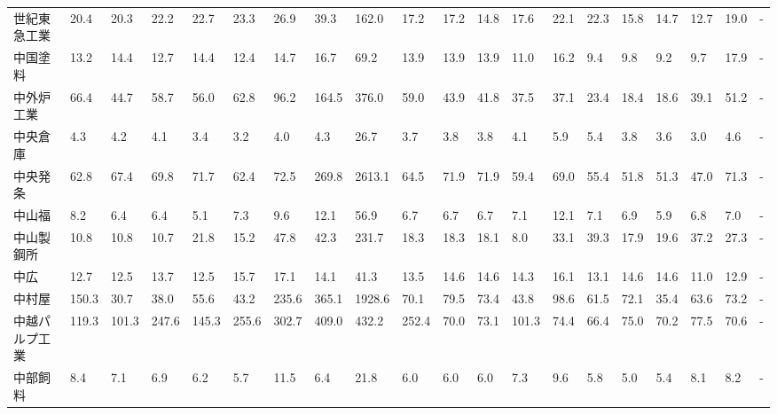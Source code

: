 \begin{tabular}{llllllllllllllllllll}
世紀東急工業          &   20.4 &   20.3 &      22.2 &      22.7 &       23.3 &    26.9 &    39.3 &    162.0 &    17.2 &    17.2 &   14.8 &   17.6 &    22.1 &    22.3 &    15.8 &   14.7 &   12.7 &    19.0 &      - \\
中国塗料            &   13.2 &   14.4 &      12.7 &      14.4 &       12.4 &    14.7 &    16.7 &     69.2 &    13.9 &    13.9 &   13.9 &   11.0 &    16.2 &     9.4 &     9.8 &    9.2 &    9.7 &    17.9 &      - \\
中外炉工業           &   66.4 &   44.7 &      58.7 &      56.0 &       62.8 &    96.2 &   164.5 &    376.0 &    59.0 &    43.9 &   41.8 &   37.5 &    37.1 &    23.4 &    18.4 &   18.6 &   39.1 &    51.2 &      - \\
中央倉庫            &    4.3 &    4.2 &       4.1 &       3.4 &        3.2 &     4.0 &     4.3 &     26.7 &     3.7 &     3.8 &    3.8 &    4.1 &     5.9 &     5.4 &     3.8 &    3.6 &    3.0 &     4.6 &      - \\
中央発条            &   62.8 &   67.4 &      69.8 &      71.7 &       62.4 &    72.5 &   269.8 &   2613.1 &    64.5 &    71.9 &   71.9 &   59.4 &    69.0 &    55.4 &    51.8 &   51.3 &   47.0 &    71.3 &      - \\
中山福             &    8.2 &    6.4 &       6.4 &       5.1 &        7.3 &     9.6 &    12.1 &     56.9 &     6.7 &     6.7 &    6.7 &    7.1 &    12.1 &     7.1 &     6.9 &    5.9 &    6.8 &     7.0 &      - \\
中山製鋼所           &   10.8 &   10.8 &      10.7 &      21.8 &       15.2 &    47.8 &    42.3 &    231.7 &    18.3 &    18.3 &   18.1 &    8.0 &    33.1 &    39.3 &    17.9 &   19.6 &   37.2 &    27.3 &      - \\
中広              &   12.7 &   12.5 &      13.7 &      12.5 &       15.7 &    17.1 &    14.1 &     41.3 &    13.5 &    14.6 &   14.6 &   14.3 &    16.1 &    13.1 &    14.6 &   14.6 &   11.0 &    12.9 &      - \\
中村屋             &  150.3 &   30.7 &      38.0 &      55.6 &       43.2 &   235.6 &   365.1 &   1928.6 &    70.1 &    79.5 &   73.4 &   43.8 &    98.6 &    61.5 &    72.1 &   35.4 &   63.6 &    73.2 &      - \\
中越パルプ工業         &  119.3 &  101.3 &     247.6 &     145.3 &      255.6 &   302.7 &   409.0 &    432.2 &   252.4 &    70.0 &   73.1 &  101.3 &    74.4 &    66.4 &    75.0 &   70.2 &   77.5 &    70.6 &      - \\
中部飼料            &    8.4 &    7.1 &       6.9 &       6.2 &        5.7 &    11.5 &     6.4 &     21.8 &     6.0 &     6.0 &    6.0 &    7.3 &     9.6 &     5.8 &     5.0 &    5.4 &    8.1 &     8.2 &      - \\

\end{tabular}
